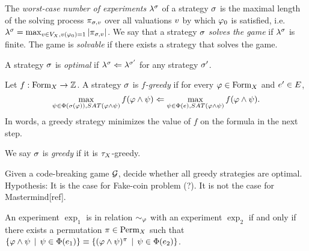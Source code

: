 The \emph{worst-case number of experiments} $\lambda^{\sigma}$
  of a strategy $\sigma$ is the maximal length of the solving process
  $\pi_{\sigma,v}$ over all valuations $v$ by which $\varphi_0$ is satisfied,
  i.e.
  $\lambda^{\sigma} = \max_{v\in V_X, v(\varphi_0) = 1} |\pi_{\sigma,v}|$.
We say that a strategy $\sigma$ \emph{solves the game} if $\lambda^{\sigma}$ is finite.
The game is \emph{solvable} if there exists a strategy that solves the game.


\begin{definition}
A strategy $\sigma$ is \emph{optimal} if
  $\lambda^{\sigma} <= \lambda^{\sigma'}$ for any strategy $\sigma'$.
\end{definition}

\begin{definition}
Let $f: \textrm{Form}_X -> \mathbb{Z}$.
A strategy $\sigma$ is \emph{$f$-greedy} if
  for every $\varphi\in\textrm{Form}_X$ and $e'\in E$,
\[
\max_{\psi \in \Phi(\sigma(\varphi)), SAT(\varphi\wedge\psi)} f(\varphi\wedge\psi) <=
\max_{\psi \in \Phi(e), SAT(\varphi\wedge\psi)} f(\varphi\wedge\psi).
\]
In words, a greedy strategy minimizes
  the value of $f$ on the formula in the next step.

We say $\sigma$ is \emph{greedy} if it is $\tau_X$-greedy.
\end{definition}


\begin{problem}
Given a code-breaking game $\mathcal{G}$,
  decide whether all greedy strategies are optimal.
Hypothesis: It is the case for Fake-coin problem (?).
  It is not the case for Mastermind[ref].
\end{problem}


\begin{definition}
An experiment $\exp_1$ is in relation $\sim_\varphi$ with an experiment $\exp_2$ if
 and only if there exists a permutation $\pi\in\textrm{Perm}_X$ such that
 $ \{ \varphi\wedge\psi \:\:|\:\: \psi\in\Phi(e_1) \} \equiv
   \{ (\varphi\wedge\psi)^\pi \:\:|\:\: \psi\in\Phi(e_2) \} $.
\end{definition}


